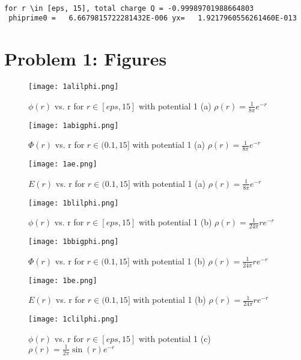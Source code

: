 \documentclass[12pt]{article}
\begin{document}
\begin{lstlisting}[frame=single,caption={Output of {\tt elpot.f90} for $\rho(r)=\frac{1}{2\pi}\cos(r)e^{-r}$},label=outputd]

for r \in [eps, 15], total charge Q = -0.99989701988664803     
 phiprime0 =   6.6679815722281432E-006 yx=   1.9217960556261460E-013

\end{lstlisting}

\section{Problem 1: Figures}

\begin{figure}[H]
\texttt{[image: 1alilphi.png]}
\caption{$\phi(r)$ vs. r for $r\in[eps,15]$ with potential 1 (a) $\rho(r)=\frac{1}{8\pi}e^{-r}$}
\label{1alilphi}
\end{figure}

\begin{figure}[H]
\texttt{[image: 1abigphi.png]}
\caption{$\Phi(r)$ vs. r for $r\in(0.1,15]$ with potential 1 (a) $\rho(r)=\frac{1}{8\pi}e^{-r}$}
\label{1abigphi}
\end{figure}

\begin{figure}[H]
\texttt{[image: 1ae.png]}
\caption{$E(r)$ vs. r for $r\in(0.1,15]$ with potential 1 (a) $\rho(r)=\frac{1}{8\pi}e^{-r}$}
\label{1ae}
\end{figure}

\begin{figure}[H]
\texttt{[image: 1blilphi.png]}
\caption{$\phi(r)$ vs. r for $r\in[eps,15]$ with potential 1 (b) $\rho(r)=\frac{1}{24\pi}re^{-r}$}
\label{1blilphi}
\end{figure}

\begin{figure}[H]
\texttt{[image: 1bbigphi.png]}
\caption{$\Phi(r)$ vs. r for $r\in(0.1,15]$ with potential 1 (b) $\rho(r)=\frac{1}{24\pi}re^{-r}$}
\label{1bbigphi}
\end{figure}

\begin{figure}[H]
\texttt{[image: 1be.png]}
\caption{$E(r)$ vs. r for $r\in(0.1,15]$ with potential 1 (b) $\rho(r)=\frac{1}{24\pi}re^{-r}$}
\label{1be}
\end{figure}

\begin{figure}[H]
\texttt{[image: 1clilphi.png]}
\caption{$\phi(r)$ vs. r for $r\in[eps,15]$ with potential 1 (c) $\rho(r)=\frac{1}{2\pi}\sin(r)e^{-r}$}
\label{1clilphi}
\end{figure}
\end{document}

